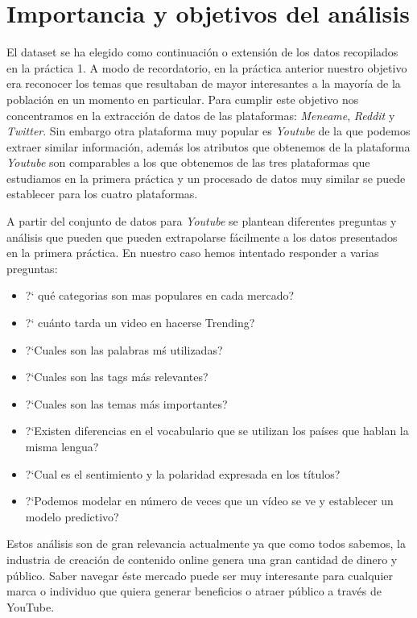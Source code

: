 \documentclass[a4paper,12pt]{article}
\begin{document}
\section[item_importancia]{Importancia y objetivos del an\'alisis}

El dataset se ha elegido como continuaci\'on o extensi\'on de los datos recopilados en la pr\'actica 1. A modo de recordatorio, en la pr\'actica anterior nuestro objetivo era reconocer los temas que resultaban de mayor interesantes a la mayor\'ia de la poblaci\'on en un momento en particular. Para cumplir este objetivo nos concentramos en la extracci\'on de datos de las plataformas:  {\itshape Meneame}, {\itshape Reddit} y {\itshape Twitter}. Sin embargo otra plataforma muy popular es {\itshape Youtube} de la que podemos extraer similar informaci\'on, adem\'as los atributos que obtenemos de la plataforma {\itshape Youtube} son comparables a los que obtenemos de las tres plataformas que estudiamos en la primera pr\'actica y un procesado de datos muy similar se puede establecer para los cuatro plataformas.

A partir del conjunto de datos para  {\itshape Youtube}  se plantean diferentes preguntas y an\'alisis que pueden que pueden extrapolarse f\'acilmente a los datos presentados en la primera pr\'actica. En nuestro caso hemos intentado responder a varias preguntas:

\begin{itemize}

\item  ?` qu\'e categorias son mas populares en cada mercado?
\item ?` cu\'anto tarda un video en hacerse Trending?
\item ?`Cuales son las palabras m\'s utilizadas?
\item ?`Cuales son las tags m\'as relevantes?
\item ?`Cuales son las temas m\'as importantes?
\item ?`Existen diferencias en el vocabulario que se utilizan los pa\'ises que hablan la misma lengua?
\item ?`Cual es el sentimiento y la polaridad expresada en los t\'itulos?
\item ?`Podemos modelar en n\'umero de veces que un v\'ideo se ve y establecer un modelo predictivo?

\end{itemize}

Estos an\'alisis son de gran relevancia actualmente ya que como todos sabemos, la industria de creaci\'on de contenido online genera una gran cantidad de dinero y p\'ublico. Saber navegar \'este mercado puede ser muy interesante para cualquier marca o individuo que quiera generar beneficios o atraer p\'ublico a trav\'es de YouTube.
\end{document}
